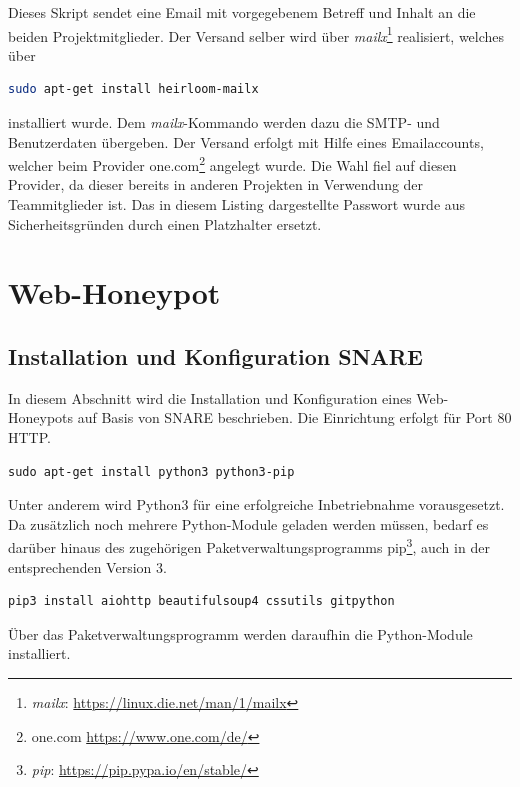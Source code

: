 Dieses Skript sendet eine Email mit vorgegebenem Betreff und Inhalt an die beiden Projektmitglieder. Der Versand selber wird über \textit{mailx}\footnote{ \textit{mailx}: \url{https://linux.die.net/man/1/mailx}} realisiert, welches über

\begin{lstlisting}[language=bash,style=customccolor]
sudo apt-get install heirloom-mailx
\end{lstlisting}

installiert wurde. Dem \textit{mailx}-Kommando werden dazu die SMTP- und Benutzerdaten übergeben. Der Versand erfolgt mit Hilfe eines Emailaccounts, welcher beim Provider one.com\footnote{ one.com \url{https://www.one.com/de/}} angelegt wurde. Die Wahl fiel auf diesen Provider, da dieser bereits in anderen Projekten in Verwendung der Teammitglieder ist. Das in diesem Listing dargestellte Passwort wurde aus Sicherheitsgründen durch einen Platzhalter ersetzt.


\section{Web-Honeypot}
\label{sec:Web-Honeypot}

\subsection{Installation und Konfiguration SNARE}
\label{subsec:Installation und Konfiguration SNARE}

In diesem Abschnitt wird die Installation und Konfiguration eines Web-Honeypots auf Basis von SNARE beschrieben. Die Einrichtung erfolgt für Port 80 HTTP. 

\begin{lstlisting}[style=customc]
sudo apt-get install python3 python3-pip
\end{lstlisting}

Unter anderem wird Python3 für eine erfolgreiche Inbetriebnahme vorausgesetzt. Da zusätzlich noch mehrere Python-Module geladen werden müssen, bedarf es darüber hinaus des zugehörigen  Paketverwaltungsprogramms pip\footnote{ \textit{pip}: \url{https://pip.pypa.io/en/stable/}}, auch in der entsprechenden Version 3.

\begin{lstlisting}[style=customc]
pip3 install aiohttp beautifulsoup4 cssutils gitpython
\end{lstlisting}

Über das Paketverwaltungsprogramm werden daraufhin die Python-Module  installiert.

